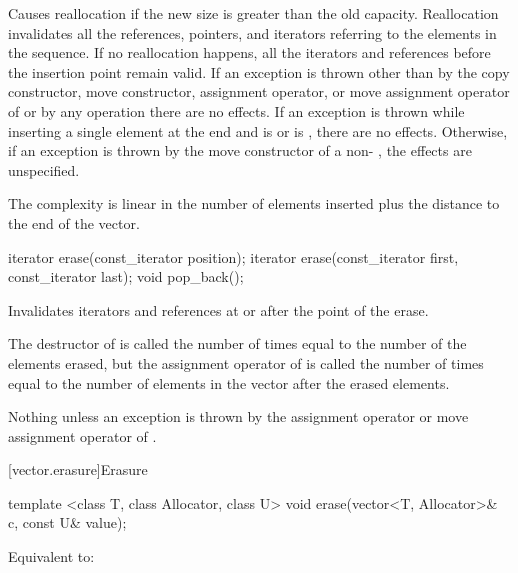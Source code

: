 \begin{itemdescr}
\pnum
\remarks
Causes reallocation if the new size is greater than the old capacity.
Reallocation invalidates all the references, pointers, and iterators
referring to the elements in the sequence.
If no reallocation happens, all the iterators and references before the insertion point remain valid.
If an exception is thrown other than by
the copy constructor, move constructor,
assignment operator, or move assignment operator of
 or by any  operation
there are no effects.
If an exception is thrown while inserting a single element at the end and
 is  or 
is , there are no effects.
Otherwise, if an exception is thrown by the move constructor of a non-
, the effects are unspecified.

\pnum
\complexity
The complexity is linear in the number of elements inserted plus the distance
to the end of the vector.
\end{itemdescr}

%
\begin{itemdecl}
iterator erase(const_iterator position);
iterator erase(const_iterator first, const_iterator last);
void pop_back();
\end{itemdecl}

\begin{itemdescr}
\pnum
\effects
Invalidates iterators and references at or after the point of the erase.

\pnum
\complexity
The destructor of  is called the number of times equal to the
number of the elements erased, but the assignment operator
of  is called the number of times equal to the number of
elements in the vector after the erased elements.

\pnum
\throws
Nothing unless an exception is thrown by the
assignment operator or move assignment operator of
.
\end{itemdescr}

[vector.erasure]{Erasure}

%
\begin{itemdecl}
template <class T, class Allocator, class U>
  void erase(vector<T, Allocator>& c, const U& value);
\end{itemdecl}

\begin{itemdescr}
\pnum
\effects
Equivalent to: 
\end{itemdescr}

